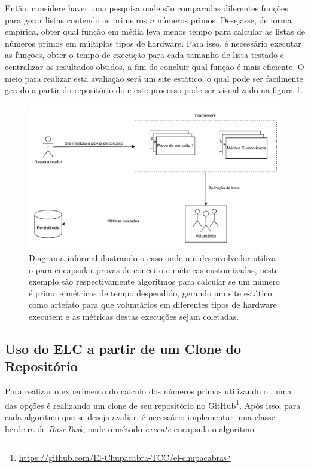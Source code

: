 \documentclass[12pt]{tcc}
\begin{document}
	Então, considere haver uma pesquisa onde são comparadas diferentes funções para gerar listas contendo os primeiros $n$ números primos. 
	Deseja-se, de forma empírica, obter qual função em média leva menos tempo para calcular as listas de números primos em múltiplos tipos de hardware.
	Para isso, é necessário executar as funções, obter o tempo de execução para cada tamanho de lista testado e centralizar os resultados obtidos, a fim de concluir qual função é mais eficiente.
	O meio para realizar esta avaliação será um site estático, o qual pode ser facilmente gerado a partir do repositório do  e este processo pode ser visualizado na figura \ref{fig:diagrama-informal}.

	\begin{figure}[!ht]
		\centering
		\includegraphics[width=\textwidth]{figures/diagrama-informal.pdf}
		\caption[Diagraama informal do uso principal do ELC]{Diagrama informal ilustrando o caso onde um desenvolvedor utiliza o  para encapsular provas de conceito e métricas customizadas, neste exemplo são respectivamente algoritmos para calcular se um número é primo e métricas de tempo despendido, gerando um site estático como artefato para que voluntários em diferentes tipos de hardware executem e as métricas destas execuções sejam coletadas.}
		\label{fig:diagrama-informal}
	\end{figure}

	\subsection{Uso do ELC a partir de um Clone do Repositório}
	\label{subsection:study-case-cloning-elc}

	Para realizar o experimento do cálculo dos números primos utilizando o , uma das opções é realizando um clone de seu repositório no GitHub\footnote{\url{https://github.com/El-Chupacabra-TCC/el-chupacabra}}.
	Após isso, para cada algoritmo que se deseja avaliar, é necessário implementar uma classe herdeira de \emph{BaseTask}, onde o método \emph{execute} encapsula o algoritmo.
\end{document}
